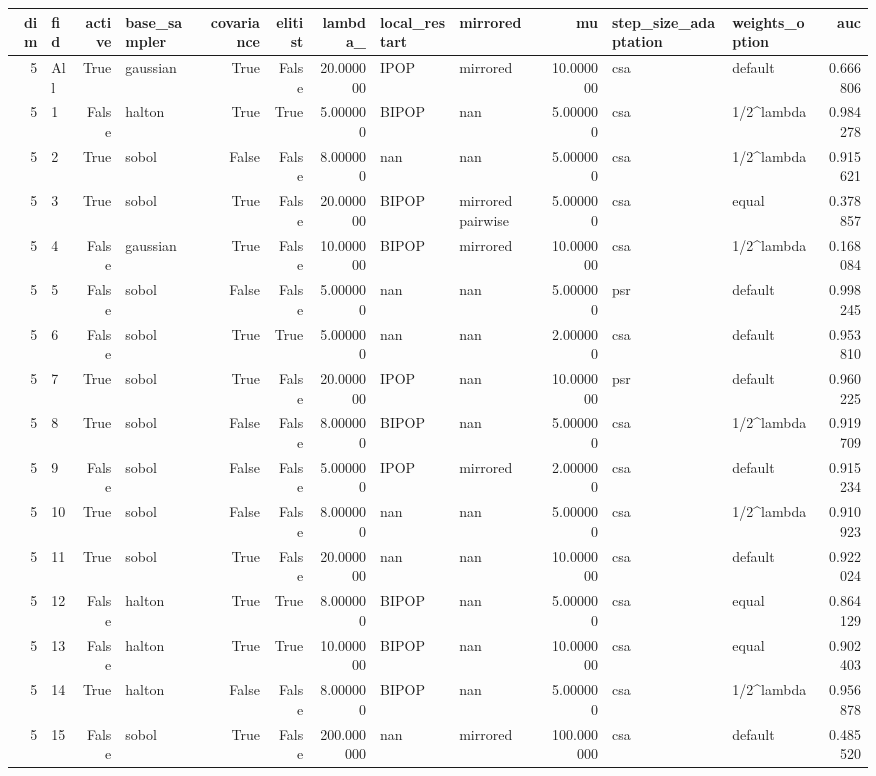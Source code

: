 \begin{tabular}{rlrlrrrllrllr}
\toprule
dim & fid & active & base_sampler & covariance & elitist & lambda_ & local_restart & mirrored & mu & step_size_adaptation & weights_option & auc \\
\midrule
5 & All & True & gaussian & True & False & 20.000000 & IPOP & mirrored & 10.000000 & csa & default & 0.666806 \\
5 & 1 & False & halton & True & True & 5.000000 & BIPOP & nan & 5.000000 & csa & 1/2^lambda & 0.984278 \\
5 & 2 & True & sobol & False & False & 8.000000 & nan & nan & 5.000000 & csa & 1/2^lambda & 0.915621 \\
5 & 3 & True & sobol & True & False & 20.000000 & BIPOP & mirrored pairwise & 5.000000 & csa & equal & 0.378857 \\
5 & 4 & False & gaussian & True & False & 10.000000 & BIPOP & mirrored & 10.000000 & csa & 1/2^lambda & 0.168084 \\
5 & 5 & False & sobol & False & False & 5.000000 & nan & nan & 5.000000 & psr & default & 0.998245 \\
5 & 6 & False & sobol & True & True & 5.000000 & nan & nan & 2.000000 & csa & default & 0.953810 \\
5 & 7 & True & sobol & True & False & 20.000000 & IPOP & nan & 10.000000 & psr & default & 0.960225 \\
5 & 8 & True & sobol & False & False & 8.000000 & BIPOP & nan & 5.000000 & csa & 1/2^lambda & 0.919709 \\
5 & 9 & False & sobol & False & False & 5.000000 & IPOP & mirrored & 2.000000 & csa & default & 0.915234 \\
5 & 10 & True & sobol & False & False & 8.000000 & nan & nan & 5.000000 & csa & 1/2^lambda & 0.910923 \\
5 & 11 & True & sobol & True & False & 20.000000 & nan & nan & 10.000000 & csa & default & 0.922024 \\
5 & 12 & False & halton & True & True & 8.000000 & BIPOP & nan & 5.000000 & csa & equal & 0.864129 \\
5 & 13 & False & halton & True & True & 10.000000 & BIPOP & nan & 10.000000 & csa & equal & 0.902403 \\
5 & 14 & True & halton & False & False & 8.000000 & BIPOP & nan & 5.000000 & csa & 1/2^lambda & 0.956878 \\
5 & 15 & False & sobol & True & False & 200.000000 & nan & mirrored & 100.000000 & csa & default & 0.485520 \\

\end{tabular}
